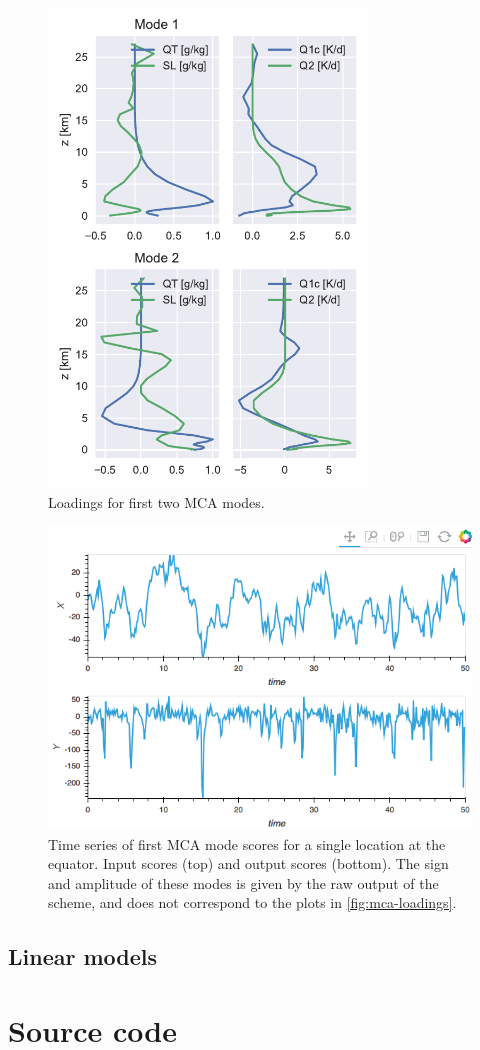 \documentclass{report}
\begin{document}
\begin{figure}
  \centering
  \includegraphics[height=5in]{images/mca_modes.pdf}
  \caption{Loadings for first two MCA modes.}
  \label{fig:mca-loadings}
\end{figure}
\begin{figure}
  \centering
  \includegraphics[width=\textwidth]{images/mca_ts.png}
  \caption{Time series of first MCA mode scores for a single location at the
    equator. 
    Input scores (top) and output scores (bottom). 
    The sign and amplitude of these modes is given by the raw output of the
    scheme, and does not correspond to the plots in \autoref{fig:mca-loadings}.}
  \label{fig:mca-ts}
\end{figure}

\section{Linear models}



\printbibliography
\appendix

\chapter{Source code}
\label{sec:source}

% 
\end{document}
